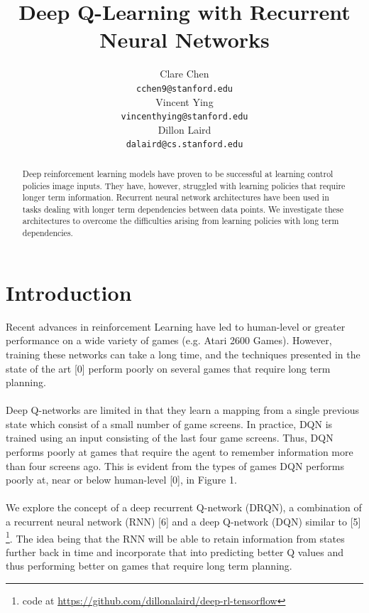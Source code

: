 \documentclass{article}
\title{Deep Q-Learning with Recurrent Neural Networks}
\author{
  Clare Chen \\
  \texttt{cchen9@stanford.edu} \\
  \And
  Vincent Ying \\
  \texttt{vincenthying@stanford.edu} \\
  \And
  Dillon Laird \\
  \texttt{dalaird@cs.stanford.edu} \\
}
\begin{document}

\maketitle

\begin{abstract}
  Deep reinforcement learning models have proven to be successful at learning
  control policies image inputs. They have, however, struggled with learning
  policies that require longer term information. Recurrent neural network
  architectures have been used in tasks dealing with longer term dependencies
  between data points. We investigate these architectures to overcome the
  difficulties arising from learning policies with long term dependencies.
\end{abstract}


\section{Introduction}
    Recent advances in reinforcement Learning have led to human-level or greater
    performance on a wide variety of games (e.g. Atari 2600 Games). However,
    training these networks can take a long time, and the techniques presented in
    the state of the art [0] perform poorly on several games that require long
    term planning. \\
    \\
    Deep Q-networks are limited in that they learn a mapping from a single
    previous state which consist of a small number of game screens. In practice,
    DQN is trained using an input consisting of the last four game screens. Thus,
    DQN performs poorly at games that require the agent to remember information
    more than four screens ago. This is evident from the types of games DQN performs
    poorly at, near or below human-level [0], in Figure 1. \\
    \\
    We explore the concept of a deep recurrent Q-network (DRQN), a combination of
    a recurrent neural network (RNN) [6] and a deep Q-network (DQN) similar to [5]
    \footnote{code at \url{https://github.com/dillonalaird/deep-rl-tensorflow}}.
    The idea being that the RNN will be able to retain information from states
    further back in time and incorporate that into predicting better Q values
    and thus performing better on games that require long term planning. \\
\end{document}

